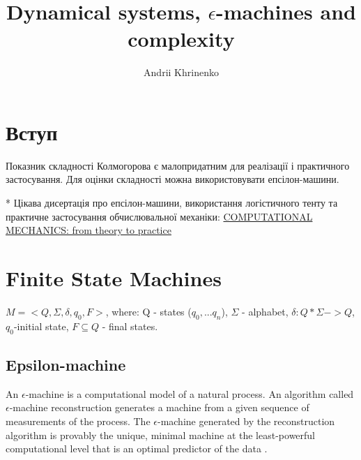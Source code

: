 \documentclass[16pt]{article}
\title{ Dynamical systems, $\epsilon$-machines and complexity }
\author{ Andrii Khrinenko }
\date{}
\begin{document}
	\maketitle	

\section{Вступ}

Показник складності Колмогорова є малопридатним для реалізації і практичного застосування. Для оцінки складності можна використовувати епсілон-машини.

* Цікава дисертація про епсілон-машини, використання логістичного тенту та практичне застосування обчислювальної механіки: \href{https://amslaurea.unibo.it/15649/1/mattia_barbaresi_tesi.pdf}{COMPUTATIONAL MECHANICS: from theory to practice} 

\section{Finite State Machines}

\( M=<Q,\Sigma,\delta,q_0,F> \), where: Q - states (\(q_0,...q_n\)), $\Sigma$ - alphabet, \(\delta:Q*\Sigma->Q\), $q_0$-initial state, \(F\subseteq Q\) - final states.

\subsection{Epsilon-machine}

An $\epsilon$-machine is a computational model of a natural process. An algorithm called $\epsilon$-machine reconstruction generates a machine from a given sequence of measurements of the process. The $\epsilon$-machine generated by the reconstruction algorithm is provably the unique, minimal machine at the least-powerful computational level that is an optimal predictor of the data \cite{shalizi2001computational}.



\end{document}
